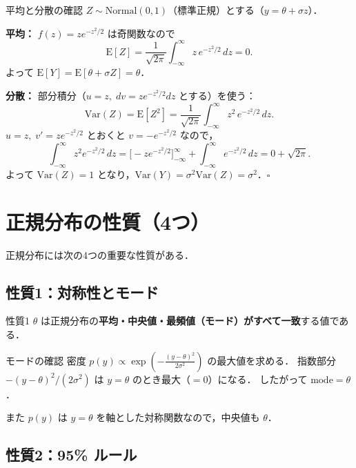 \documentclass[lualatex,ja=standard,a4paper,12pt]{bxjsarticle}
\begin{document}
\begin{derivbox}{平均と分散の確認}
$Z \sim \mathrm{Normal}(0,1)$（標準正規）とする（$y = \theta + \sigma z$）．

\medskip
\noindent\textbf{平均：} $f(z) = ze^{-z^2/2}$ は奇関数なので
\[
  \mathrm{E}[Z] = \frac{1}{\sqrt{2\pi}}\int_{-\infty}^{\infty} z\,e^{-z^2/2}\,dz = 0.
\]
よって $\mathrm{E}[Y] = \mathrm{E}[\theta + \sigma Z] = \theta$．

\medskip
\noindent\textbf{分散：} 部分積分（$u = z,\; dv = ze^{-z^2/2}dz$ とする）を使う：
\[
  \mathrm{Var}(Z) = \mathrm{E}[Z^2]
  = \frac{1}{\sqrt{2\pi}}\int_{-\infty}^{\infty} z^2\,e^{-z^2/2}\,dz.
\]
$u = z,\; v' = ze^{-z^2/2}$ とおくと $v = -e^{-z^2/2}$ なので，
\[
  \int_{-\infty}^{\infty} z^2 e^{-z^2/2}\,dz
  = \Big[-ze^{-z^2/2}\Big]_{-\infty}^{\infty}
  + \int_{-\infty}^{\infty} e^{-z^2/2}\,dz
  = 0 + \sqrt{2\pi}.
\]
よって $\mathrm{Var}(Z) = 1$ となり，$\mathrm{Var}(Y) = \sigma^2 \mathrm{Var}(Z) = \sigma^2$．\hfill $\square$
\end{derivbox}


\section{正規分布の性質（4つ）}

\noindent 正規分布には次の4つの重要な性質がある．

\subsection{性質1：対称性とモード}

\begin{thmbox}{性質1}
$\theta$ は正規分布の\textbf{平均・中央値・最頻値（モード）がすべて一致}する値である．
\end{thmbox}

\begin{derivbox}{モードの確認}
密度 $p(y) \propto \exp\!\left(-\frac{(y-\theta)^2}{2\sigma^2}\right)$ の最大値を求める．
指数部分 $-(y-\theta)^2/(2\sigma^2)$ は $y = \theta$ のとき最大（$=0$）になる．
したがって $\mathrm{mode} = \theta$．

また $p(y)$ は $y = \theta$ を軸とした対称関数なので，中央値も $\theta$．
\end{derivbox}

\subsection{性質2：95\% ルール}
\end{document}
